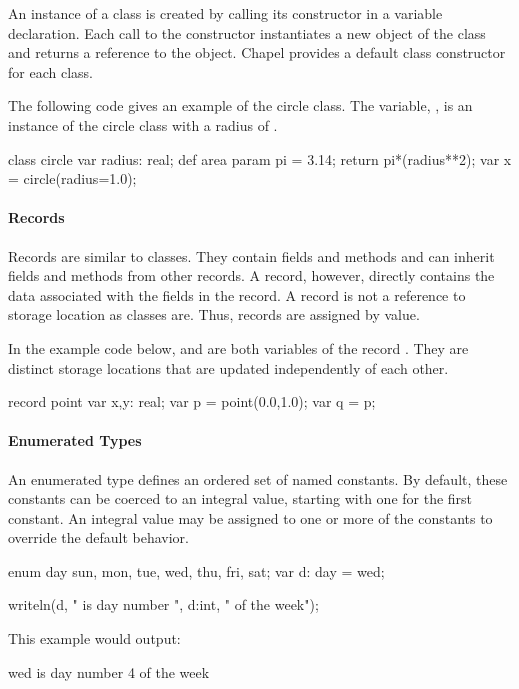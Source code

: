 An instance of a class is created by calling its constructor
in a variable declaration.  Each call to the constructor
instantiates a new object of the class and returns a reference to 
the object.  Chapel provides a default class constructor for each class.

\begin{example}
The following code gives an example of the circle class.  
The variable, , is an instance of the circle class with
a radius of .
\begin{chapel}
class circle {
  var radius: real;
  def area {
    param pi = 3.14;
    return pi*(radius**2);
  }
}
var x = circle(radius=1.0);
\end{chapel}
\end{example}

\paragraph{Records}
Records are similar to classes.  They contain fields and methods
and can inherit fields and methods from other records.  A record,
however, directly contains the data associated with the fields
in the record.  A record is not a reference to storage location as
classes are.  Thus, records are assigned by value.  

\begin{example}
In the example code below,  and  are both
variables of the record .  They are distinct storage
locations that are updated independently of each other.

\begin{chapel}
record point {
  var x,y: real;
}
var p = point(0.0,1.0);
var q = p;
\end{chapel}
\end{example}

\paragraph{Enumerated Types}
An enumerated type defines an ordered set of named constants.
By default, these constants can be coerced to an 
integral value, starting with one for the first constant. 
An integral value may be assigned to one or more of the constants
to override the default behavior. 

\begin{example}
\begin{chapel}
enum day {sun, mon, tue, wed, thu, fri, sat};
var d: day = wed;

writeln(d, " is day number ", d:int, " of the week");
\end{chapel}

This example would output:
\begin{commandline}
wed is day number 4 of the week
\end{commandline}
\end{example}

